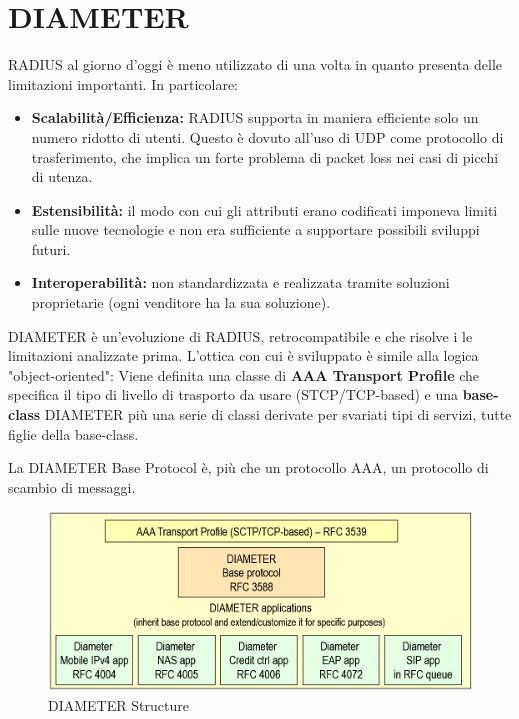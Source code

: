 \section{DIAMETER}
RADIUS al giorno d'oggi è meno utilizzato di una volta in quanto presenta delle limitazioni importanti. In particolare:
\begin{itemize}
    \item \textbf{Scalabilità/Efficienza:} RADIUS supporta in maniera efficiente solo un numero ridotto di utenti. Questo è dovuto all'uso di UDP come protocollo di trasferimento, che implica un forte problema di packet loss nei casi di picchi di utenza.
    \item \textbf{Estensibilità:} il modo con cui gli attributi erano codificati imponeva limiti sulle nuove tecnologie e non era sufficiente a supportare possibili sviluppi futuri.
    \item \textbf{Interoperabilità:} non standardizzata e realizzata tramite soluzioni proprietarie (ogni venditore ha la sua soluzione).
\end{itemize}
DIAMETER è un'evoluzione di RADIUS, retrocompatibile e che risolve i le limitazioni analizzate prima. L'ottica con cui è sviluppato è simile alla logica "object-oriented": Viene definita una classe di \textbf{AAA Transport Profile} che specifica il tipo di livello di trasporto da usare (STCP/TCP-based) e una \textbf{base-class} DIAMETER più una serie di classi derivate per svariati tipi di servizi, tutte figlie della base-class.
\begin{note}
La DIAMETER Base Protocol è, più che un protocollo AAA, un protocollo di scambio di messaggi. 
\end{note}
\begin{figure}[h]
    \centering
    \includegraphics{image/diameter.png}
    \caption{DIAMETER Structure}
    \label{fig:diameter}
\end{figure}
